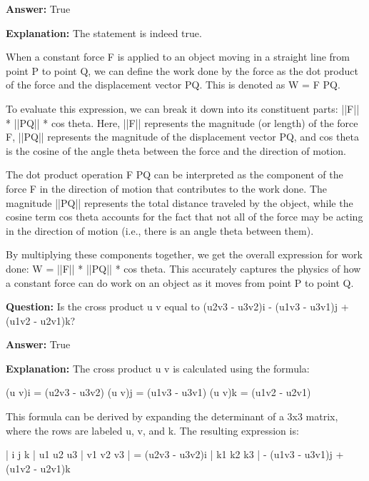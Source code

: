\documentclass{article}
\begin{document}
                \textbf{Answer:} True

                \textbf{Explanation:} The statement is indeed true.

When a constant force F is applied to an object moving in a straight line from point P to point Q, we can define the work done by the force as the dot product of the force and the displacement vector PQ. This is denoted as W = F {\textperiodcentered} PQ.

To evaluate this expression, we can break it down into its constituent parts: ||F|| * ||PQ|| * cos theta. Here, ||F|| represents the magnitude (or length) of the force F, ||PQ|| represents the magnitude of the displacement vector PQ, and cos theta is the cosine of the angle theta between the force and the direction of motion.

The dot product operation F {\textperiodcentered} PQ can be interpreted as the component of the force F in the direction of motion that contributes to the work done. The magnitude ||PQ|| represents the total distance traveled by the object, while the cosine term cos theta accounts for the fact that not all of the force may be acting in the direction of motion (i.e., there is an angle theta between them).

By multiplying these components together, we get the overall expression for work done: W = ||F|| * ||PQ|| * cos theta. This accurately captures the physics of how a constant force can do work on an object as it moves from point P to point Q.
                
                \vspace{0.5cm} 
        
            
                \textbf {Question:} Is the cross product u {\texttimes} v equal to (u2v3 - u3v2)i - (u1v3 - u3v1)j + (u1v2 - u2v1)k?
                
                \textbf{Answer:} True

                \textbf{Explanation:} The cross product u {\texttimes} v is calculated using the formula:

(u {\texttimes} v)i = (u2v3 - u3v2)
(u {\texttimes} v)j = (u1v3 - u3v1)
(u {\texttimes} v)k = (u1v2 - u2v1)

This formula can be derived by expanding the determinant of a 3x3 matrix, where the rows are labeled u, v, and k. The resulting expression is:

| i j k | u1 u2 u3
| v1 v2 v3 | = (u2v3 - u3v2)i
| k1 k2 k3 | - (u1v3 - u3v1)j + (u1v2 - u2v1)k
\end{document}
